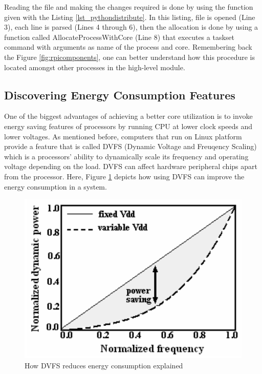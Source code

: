 Reading the file and making the changes required is done by using the function given with the Listing \ref{lst_pythondistribute}. In this listing, file is opened (Line 3), each line is parsed (Lines 4 through 6), then the allocation is done by using a function called AllocateProcessWithCore (Line 8) that executes a taskset command with arguments as name of the process and core. Remembering back the Figure \ref{fig:rpicomponents}, one can better understand how this procedure is located amongst other processes in the high-level module.


\subsection{Discovering Energy Consumption Features}
One of the biggest advantages of achieving a better core utilization is to invoke energy saving features of processors by running CPU at lower clock speeds and lower voltages. As mentioned before, computers that run on Linux platform provide a feature that is called DVFS (Dynamic Voltage and Freuqency Scaling) \cite{dvfsieee} which is a processors' ability to dynamically scale its frequency and operating voltage depending on the load. DVFS can affect hardware peripheral chips apart from the processor. Here, Figure \ref{fig:dvfsexplanation} \cite{dvfspaper} depicts how using DVFS can improve the energy consumption in a system.

\begin{figure}[!ht]
	\centering
	\captionsetup{justification=centering}
	\includegraphics[scale=0.40]{content/images/dvfsexplanation.png}
	\caption{How DVFS reduces energy consumption explained \cite{dvfspaper}}
	\label{fig:dvfsexplanation}
\end{figure}


